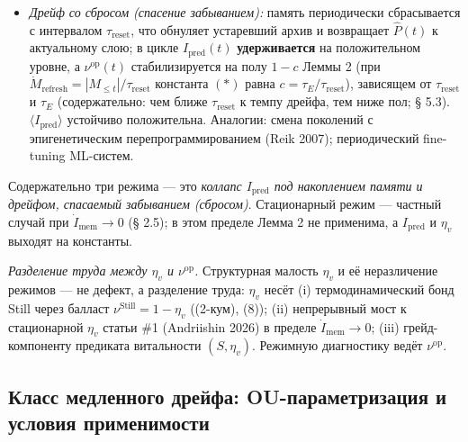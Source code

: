 \documentclass[pdflatex,sn-mathphys-ay]{sn-jnl}
\begin{document}
\begin{itemize}
\item

  \emph{Дрейф со сбросом (спасение забыванием):} память периодически сбрасывается с интервалом \(\tau_{\text{reset}}\), что обнуляет устаревший архив и возвращает \(\hat P(t)\) к актуальному слою; в цикле \(I_{\text{pred}}(t)\) \textbf{удерживается} на положительном уровне, а \(\nu^{\text{op}}(t)\) стабилизируется на полу \(1-c\) Леммы 2 (при \(\dot M_{\text{refresh}} = |M_{\le t}|/\tau_{\text{reset}}\) константа \((*)\) равна \(c = \tau_E/\tau_{\text{reset}}\)), зависящем от \(\tau_{\text{reset}}\) и \(\tau_E\) (содержательно: чем ближе \(\tau_{\text{reset}}\) к темпу дрейфа, тем ниже пол; § 5.3). \(\langle I_{\text{pred}}\rangle\) устойчиво положительна. Аналогии: смена поколений с эпигенетическим перепрограммированием (Reik 2007); периодический fine-tuning ML-систем.

\end{itemize}



Содержательно три режима --- это \emph{коллапс \(I_{\text{pred}}\) под накоплением памяти и дрейфом, спасаемый забыванием (сбросом)}. Стационарный режим --- частный случай при \(\dot{I}_{\text{mem}} \to 0\) (§ 2.5); в этом пределе Лемма 2 не применима, а \(I_{\text{pred}}\) и \(\eta_v\) выходят на константы.



\emph{Разделение труда между \(\eta_v\) и \(\nu^{\text{op}}\).} Структурная малость \(\eta_v\) и её неразличение режимов --- не дефект, а разделение труда: \(\eta_v\) несёт (i) термодинамический бонд Still через балласт \(\nu^{\text{Still}} = 1 - \eta_v\) ((2-кум), (8)); (ii) непрерывный мост к стационарной \(\eta_v\) статьи \#1 (Andriishin 2026) в пределе \(\dot{I}_{\text{mem}} \to 0\); (iii) грейд-компоненту предиката витальности \((S, \eta_v)\). Режимную диагностику ведёт \(\nu^{\text{op}}\).



\subsection{Класс медленного дрейфа: OU-параметризация и условия применимости}\label{ux43aux43bux430ux441ux441-ux43cux435ux434ux43bux435ux43dux43dux43eux433ux43e-ux434ux440ux435ux439ux444ux430-ou-ux43fux430ux440ux430ux43cux435ux442ux440ux438ux437ux430ux446ux438ux44f-ux438-ux443ux441ux43bux43eux432ux438ux44f-ux43fux440ux438ux43cux435ux43dux438ux43cux43eux441ux442ux438}
\end{document}
